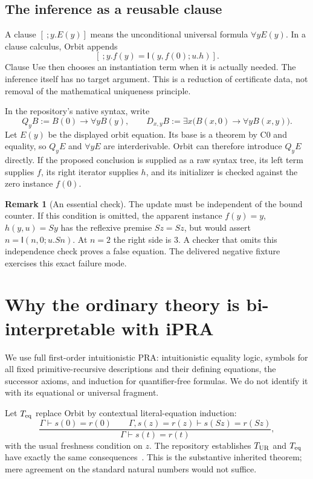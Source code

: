 \documentclass[11pt]{article}
\theoremstyle{definition}
\newtheorem{remark}[theorem]{Remark}
\newcommand{\Teq}{T_{\rm eq}}
\newcommand{\Tur}{T_{\rm UR}}
\newcommand{\I}{\mathsf I}
\newcommand{\G}{\Gamma}
\begin{document}
\subsection{The inference as a reusable clause}

A clause $[\ ;y.E(y)]$ means the unconditional universal formula $\forall yE(y)$. In a clause calculus, Orbit appends
\[
 [\ ;y.f(y)=\I(y,f(0);u.h)].
\]
Clause Use then chooses an instantiation term when it is actually needed. The inference itself has no target argument. This is a reduction of certificate data, not removal of the mathematical uniqueness principle.

In the repository's native syntax, write
\[
 Q_yB:=B(0)\to\forall yB(y),\qquad
 D_{x,y}B:=\exists x\bigl(B(x,0)\to\forall yB(x,y)\bigr).
\]
Let $E(y)$ be the displayed orbit equation. Its base is a theorem by C0 and equality, so $Q_yE$ and $\forall yE$ are interderivable. Orbit can therefore introduce $Q_yE$ directly. If the proposed conclusion is supplied as a raw syntax tree, its left term supplies $f$, its right iterator supplies $h$, and its initializer is checked against the zero instance $f(0)$.

\begin{remark}[An essential check]
The update must be independent of the bound counter. If this condition is omitted, the apparent instance $f(y)=y$, $h(y,u)=Sy$ has the reflexive premise $Sz=Sz$, but would assert $n=\I(n,0;u.Sn)$. At $n=2$ the right side is $3$. A checker that omits this independence check proves a false equation. The delivered negative fixture exercises this exact failure mode.
\end{remark}

\section{Why the ordinary theory is bi-interpretable with iPRA}
\label{sec:bridge}

We use full first-order intuitionistic PRA: intuitionistic equality logic, symbols for all fixed primitive-recursive descriptions and their defining equations, the successor axioms, and induction for quantifier-free formulas. We do not identify it with its equational or universal fragment.

Let $\Teq$ replace Orbit by contextual literal-equation induction:
\[
 \frac{\G\vdash s(0)=r(0)\qquad
       \G,s(z)=r(z)\vdash s(Sz)=r(Sz)}
      {\G\vdash s(t)=r(t)},
\]
with the usual freshness condition on $z$. The repository establishes
$\Tur$ and $\Teq$ have exactly the same consequences~\cite{ur}.
This is the substantive inherited theorem; mere agreement on the standard natural numbers would not suffice.
\end{document}
